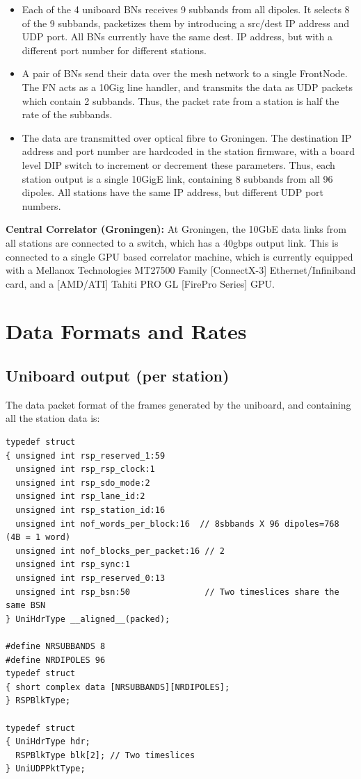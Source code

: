 \documentclass {article}
\begin{document}
\begin {itemize}
  \item Each of  the 4 uniboard BNs  receives 9 subbands from  all dipoles. It
    selects 8 of the 9 subbands,  packetizes them by introducing a src/dest IP
    address and UDP  port. All BNs currently have the  same dest.  IP address,
    but with a different port number for different stations.

  \item  A pair  of BNs  send their  data over  the mesh  network to  a single
    FrontNode. The FN acts as a 10Gig  line handler, and transmits the data as
    UDP packets which contain 2 subbands. Thus, the packet rate from a station
    is half the rate of the subbands.

  \item  The  data  are  transmitted  over optical  fibre  to  Groningen.  The
    destination  IP address  and  port  number are  hardcoded  in the  station
    firmware, with  a board level DIP  switch to increment or  decrement these
    parameters. Thus, each station output  is a single 10GigE link, containing
    8 subbands from all 96 dipoles. All stations have the same IP address, but
    different UDP port numbers.\\
\end{itemize}

\textbf{Central Correlator  (Groningen):} At  Groningen, the 10GbE  data links
from  all stations  are  connected to  a  switch, which  has  a 40gbps  output
link. This  is connected to  a single GPU  based correlator machine,  which is
currently equipped  with a  Mellanox Technologies MT27500  Family [ConnectX-3]
Ethernet/Infiniband card, and a [AMD/ATI] Tahiti PRO GL [FirePro Series] GPU.

\section {Data Formats and Rates}
\subsection {Uniboard output (per station)}
The data packet  format of the frames generated by  the uniboard, and containing
all the station data is:
\begin{lstlisting}
typedef struct
{ unsigned int rsp_reserved_1:59
  unsigned int rsp_rsp_clock:1
  unsigned int rsp_sdo_mode:2
  unsigned int rsp_lane_id:2
  unsigned int rsp_station_id:16
  unsigned int nof_words_per_block:16  // 8sbbands X 96 dipoles=768 (4B = 1 word)
  unsigned int nof_blocks_per_packet:16 // 2
  unsigned int rsp_sync:1
  unsigned int rsp_reserved_0:13
  unsigned int rsp_bsn:50               // Two timeslices share the same BSN
} UniHdrType __aligned__(packed);

#define NRSUBBANDS 8
#define NRDIPOLES 96
typedef struct
{ short complex data [NRSUBBANDS][NRDIPOLES];
} RSPBlkType;

typedef struct
{ UniHdrType hdr;
  RSPBlkType blk[2]; // Two timeslices 
} UniUDPPktType;

\end{lstlisting}
\end{document}
